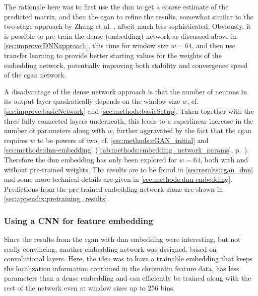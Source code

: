 The rationale here was to first use the \acrshort{dnn} to get a coarse estimate of the predicted matrix,
and then the \acrshort{cgan} to refine the results, somewhat similar to the two-stage approach by Zhang et al. \cite{Zhang2019c},
albeit much less sophisticated. 
Obviously, it is possible to pre-train the dense (embedding) network as discussed above in \cref{sec:improve:DNNapproach}, 
this time for window size $w=64$, and then use transfer learning to provide better starting values for the weights of the embedding network, 
potentially improving both stability and convergence speed of the \acrshort{cgan} network.

A disadvantage of the dense network approach is that the number of neurons in its output layer quadratically depends on the window size $w$,
cf. \cref{sec:improve:basicNetwork} and \ref{sec:methods:basicSetup}.
Taken together with the three fully connected layers underneath, this leads to a superlinear increase in the number of parameters along with $w$,
further aggravated by the fact that the \acrshort{cgan} requires $w$ to be powers of two, cf. \cref{sec:methods:cGAN_initial} and  
\ref{sec:methods:dnn-embedding} (\cref{tab:methods:embedding_network_params}, p.~\pageref{tab:methods:embedding_network_params}).
Therefore the \acrshort{dnn} embedding has only been explored for $w=64$, both with and without pre-trained weights. 
The results are to be found in \cref{sec:results:cgan_dnn} and some more technical details are given in \cref{sec:methods:dnn-embedding}.
Predictions from the pre-trained embedding network alone are shown in \cref{sec:appendix:pretraining_results}.

\subsubsection{Using a CNN for feature embedding} \label{sec:improve:CNN_embedding}
Since the results from the \acrshort{cgan} with \acrshort{dnn} embedding were interesting, but not really convincing, 
another embedding network was designed, based on convolutional layers.
Here, the idea was to have a trainable embedding that keeps the localization information contained in the chromatin feature data,
has less parameters than a dense embedding and can efficiently be trained along with the rest of the network even at window sizes up to 256 bins.

